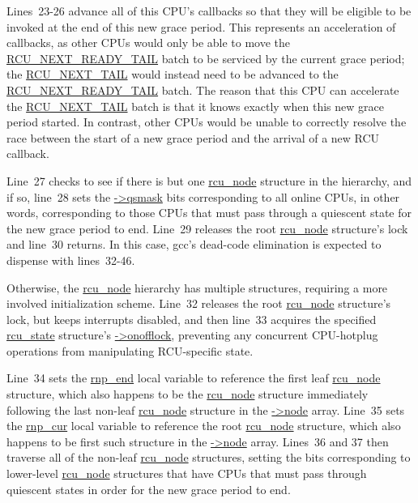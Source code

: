 Lines~23-26 advance all of this CPU's callbacks so that they will
be eligible to be invoked at the end of this new grace period.
This represents an acceleration of callbacks, as other CPUs would only
be able to move the \url{RCU_NEXT_READY_TAIL} batch to be serviced
by the current grace period; the \url{RCU_NEXT_TAIL} would instead
need to be advanced to the \url{RCU_NEXT_READY_TAIL} batch.
The reason that this CPU can accelerate the \url{RCU_NEXT_TAIL} batch
is that it knows exactly when this new grace period started.
In contrast, other CPUs would be unable to correctly resolve the
race between the start of a new grace period and the arrival of
a new RCU callback.

Line~27 checks to see if there is but one \url{rcu_node} structure in
the hierarchy, and if so, line~28 sets the \url{->qsmask}
bits corresponding to all online CPUs, in other words, corresponding
to those CPUs that must pass through a quiescent state for the new
grace period to end.
Line~29 releases the root \url{rcu_node} structure's lock and line~30
returns.
In this case, gcc's dead-code elimination is expected to dispense with
lines~32-46.

Otherwise, the \url{rcu_node} hierarchy has multiple structures, requiring
a more involved initialization scheme.
Line~32 releases the root \url{rcu_node} structure's lock, but keeps
interrupts disabled, and then line~33 acquires the specified
\url{rcu_state} structure's \url{->onofflock}, preventing any
concurrent CPU-hotplug operations from manipulating RCU-specific state.

Line~34 sets the \url{rnp_end} local variable to reference the first
leaf \url{rcu_node} structure, which also happens to be the
\url{rcu_node} structure immediately following the last non-leaf
\url{rcu_node} structure in the \url{->node} array.
Line~35 sets the \url{rnp_cur} local variable to reference the root
\url{rcu_node} structure, which also happens to be first such structure
in the \url{->node} array.
Lines~36 and 37 then traverse all of the non-leaf \url{rcu_node} structures,
setting the bits corresponding to lower-level \url{rcu_node} structures
that have CPUs that must pass through quiescent states in order for
the new grace period to end.

